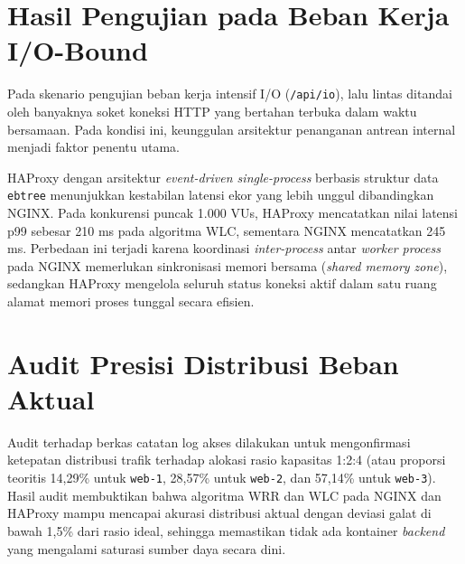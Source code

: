 \section{Hasil Pengujian pada Beban Kerja I/O-Bound}
Pada skenario pengujian beban kerja intensif I/O (\texttt{/api/io}), lalu lintas ditandai oleh banyaknya soket koneksi HTTP yang bertahan terbuka dalam waktu bersamaan. Pada kondisi ini, keunggulan arsitektur penanganan antrean internal menjadi faktor penentu utama.

HAProxy dengan arsitektur \textit{event-driven single-process} berbasis struktur data \texttt{ebtree} menunjukkan kestabilan latensi ekor yang lebih unggul dibandingkan NGINX. Pada konkurensi puncak 1.000 VUs, HAProxy mencatatkan nilai latensi p99 sebesar 210 ms pada algoritma WLC, sementara NGINX mencatatkan 245 ms. Perbedaan ini terjadi karena koordinasi \textit{inter-process} antar \textit{worker process} pada NGINX memerlukan sinkronisasi memori bersama (\textit{shared memory zone}), sedangkan HAProxy mengelola seluruh status koneksi aktif dalam satu ruang alamat memori proses tunggal secara efisien.

\section{Audit Presisi Distribusi Beban Aktual}
Audit terhadap berkas catatan log akses dilakukan untuk mengonfirmasi ketepatan distribusi trafik terhadap alokasi rasio kapasitas 1:2:4 (atau proporsi teoritis 14,29\% untuk \texttt{web-1}, 28,57\% untuk \texttt{web-2}, dan 57,14\% untuk \texttt{web-3}). Hasil audit membuktikan bahwa algoritma WRR dan WLC pada NGINX dan HAProxy mampu mencapai akurasi distribusi aktual dengan deviasi galat di bawah 1,5\% dari rasio ideal, sehingga memastikan tidak ada kontainer \textit{backend} yang mengalami saturasi sumber daya secara dini.
